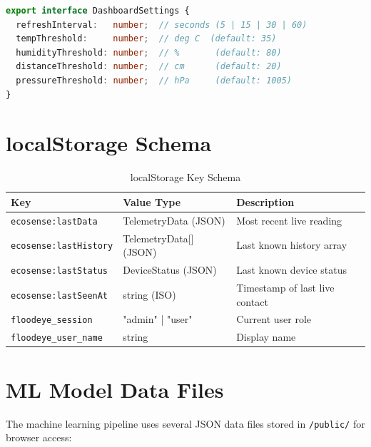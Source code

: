 \begin{lstlisting}[language=TypeScript,caption={DashboardSettings interface}]
export interface DashboardSettings {
  refreshInterval:   number;  // seconds (5 | 15 | 30 | 60)
  tempThreshold:     number;  // deg C  (default: 35)
  humidityThreshold: number;  // %       (default: 80)
  distanceThreshold: number;  // cm      (default: 20)
  pressureThreshold: number;  // hPa     (default: 1005)
}
\end{lstlisting}

\section{localStorage Schema}

\begin{table}[H]
\centering
\caption{localStorage Key Schema}
\begin{tabularx}{\linewidth}{|l|l|X|}
\hline
\rowcolor{FloodLight}
\textbf{Key} & \textbf{Value Type} & \textbf{Description} \\
\hline
\texttt{ecosense:lastData} & TelemetryData (JSON) & Most recent live reading \\
\texttt{ecosense:lastHistory} & TelemetryData[] (JSON) & Last known history array \\
\texttt{ecosense:lastStatus} & DeviceStatus (JSON) & Last known device status \\
\texttt{ecosense:lastSeenAt} & string (ISO) & Timestamp of last live contact \\
\texttt{floodeye\_\allowbreak{}session} & "admin" | "user" & Current user role \\
\texttt{floodeye\_\allowbreak{}user\_\allowbreak{}name} & string & Display name \\
\hline
\end{tabularx}
\end{table}

\section{ML Model Data Files}

The machine learning pipeline uses several JSON data files stored in \texttt{/\allowbreak{}public/\allowbreak{}} for browser access:

